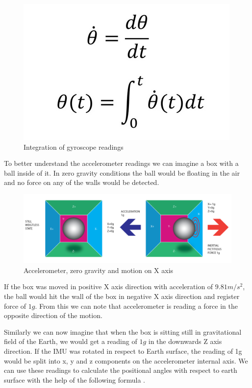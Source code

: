 \begin{figure}[H]
    \begin{center}
    \includegraphics[scale = 0.4]{pictures/IMU/gyro_calculation.png}
    \end{center}
    \caption{Integration of gyroscope readings}
    \label{fig:my_label}
\end{figure}


To better understand the accelerometer readings we can imagine a box with a ball inside of it. In zero gravity conditions the ball would be floating in the air and no force on any of the walls would be detected.


\begin{figure}[H]
    \begin{center}
    \includegraphics[scale = 0.5]{pictures/IMU/Accel_0grav.png}
    \end{center}
    \caption{Accelerometer, zero gravity and motion on X axis }
    \label{fig:my_label}
\end{figure}

If the box was moved in positive X axis direction with acceleration of $9.81 m/s^2$, the ball would hit the wall of the box in negative X axis direction and register force of $1g$. From this we can note that accelerometer is reading a force in the opposite direction of the motion. 

Similarly we can now imagine that when the box is sitting still in gravitational field of the Earth, we would get a reading of $1g$ in the downwards Z axis direction. If the IMU was rotated in respect to Earth surface, the reading of 1g would be split into x, y and z components on the accelerometer internal axis. We can use these readings to calculate the positional angles with respect to earth surface with the help of the following formula .

